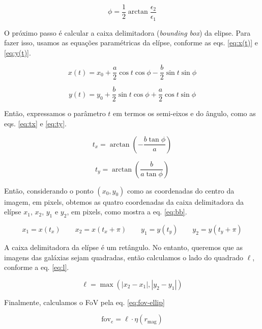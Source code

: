 \begin{equation}\label{eq:phi}
  \phi = \frac{1}{2}\arctan\frac{\epsilon_2}{\epsilon_1}
\end{equation}

O próximo passo é calcular a caixa delimitadora (\emph{bounding box}) da elipse. Para fazer isso, usamos as equações paramétricas da elípse, conforme as eqs. \eqref{eq:x(t)} e \eqref{eq:y(t)}.

\begin{equation}\label{eq:x(t)}
  x(t) = x_0 + \frac{a}{2} \cos t \cos\phi - \frac{b}{2} \sin t \sin\phi
\end{equation}

\begin{equation}\label{eq:y(t)}
  y(t) = y_0 + \frac{b}{2} \sin t \cos\phi + \frac{a}{2} \cos t \sin\phi
\end{equation}

Então, expressamos o parâmetro $t$ em termos os semi-eixos e do ângulo, como as eqs. \eqref{eq:tx} e \eqref{eq:ty}.

\begin{equation}\label{eq:tx}
  t_x = \arctan\left(-\frac{b\tan\phi}{a}\right)
\end{equation}

\begin{equation}\label{eq:ty}
  t_y = \arctan\left(\frac{b}{a\tan\phi}\right)
\end{equation}

Então, considerando o ponto $(x_0, y_0)$ como as coordenadas do centro da imagem, em pixels, obtemos as quatro coordenadas da caixa delimitadora da elípse $x_1$, $x_2$, $y_1$ e $y_2$, em pixels, como mostra a eq. \eqref{eq:bb}.

\begin{equation}\label{eq:bb}
  x_1 = x(t_x) \qquad x_2 = x(t_x + \pi) \qquad y_1 = y(t_y) \qquad y_2 = y(t_y + \pi)
\end{equation}

A caixa delimitadora da elípse é um retângulo. No entanto, queremos que as imagens das galáxias sejam quadradas, então calculamos o lado do quadrado $\ell$, conforme a eq. \eqref{eq:l}.

\begin{equation}\label{eq:l}
  \ell = \max(|x_2 - x_1|, |y_2 - y_1|)
\end{equation}

Finalmente, calculamos o FoV pela eq. \eqref{eq:fov-ellip}

\begin{equation}\label{eq:fov-ellip}
  \mathrm{fov}_e = \ell \cdot \eta(r_{\mathrm{mag}})
\end{equation}

